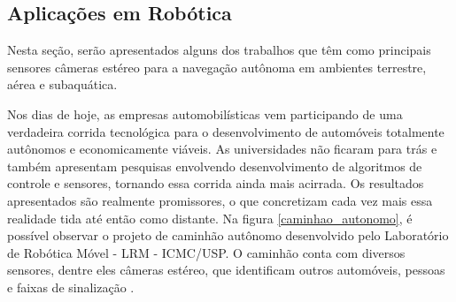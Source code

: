 


\subsection{Aplicações em Robótica}
\label{aplicacoes_robotica}
Nesta seção, serão apresentados alguns dos trabalhos que têm como principais sensores câmeras estéreo para a navegação autônoma em ambientes terrestre, aérea e subaquática.

Nos dias de hoje, as empresas automobilísticas vem participando de uma verdadeira corrida tecnológica para o desenvolvimento de automóveis totalmente autônomos e economicamente viáveis. As universidades não ficaram para trás e também apresentam pesquisas envolvendo desenvolvimento de algoritmos de controle e sensores, tornando essa corrida ainda mais acirrada. Os resultados apresentados são realmente promissores, o que concretizam cada vez mais essa realidade tida até então como distante. Na figura \ref{caminhao_autonomo}, é possível observar o projeto de caminhão autônomo desenvolvido pelo Laboratório de Robótica Móvel - LRM - ICMC/USP. O caminhão conta com diversos sensores, dentre eles câmeras estéreo, que identificam outros automóveis, pessoas e faixas de sinalização \cite{ShinzatoP}. 

